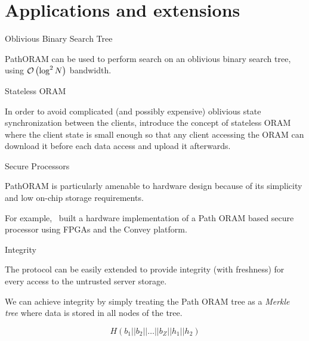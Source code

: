 
\section{Applications and extensions}

	\begin{frame}{Oblivious Binary Search Tree}
		
		PathORAM can be used to perform search on an oblivious binary search tree, using $\mathcal{O}\left(\log^2 N\right)$ bandwidth.~\cite{Gentry:2013}

	\end{frame}

	\begin{frame}{Stateless ORAM}
		
		In order to avoid complicated (and possibly expensive) oblivious state synchronization between the clients, \citeauthor{DBLP:journals/corr/abs-1105-4125} introduce the concept of stateless ORAM~\cite{DBLP:journals/corr/abs-1105-4125} where the client state is small enough so that any client accessing the ORAM can download it before each data access and upload it afterwards.

	\end{frame}

	\begin{frame}{Secure Processors}
		
		PathORAM is particularly amenable to hardware design because of its simplicity and low on-chip storage requirements.

		For example,~\textcite{Maas:EECS-2014-89} built a hardware implementation of a Path ORAM based secure processor using FPGAs and the Convey platform. %

	\end{frame}

	\begin{frame}{Integrity}
		
		The protocol can be easily extended to provide integrity (with freshness) for every access to the untrusted server storage.

		We can achieve integrity by simply treating the Path ORAM tree as a \emph{Merkle tree} where data is stored in all nodes of the tree.

		\[
			H (b_1 || b_2 || \ldots || b_Z || h_1 || h_2 )
		\]

	\end{frame}
